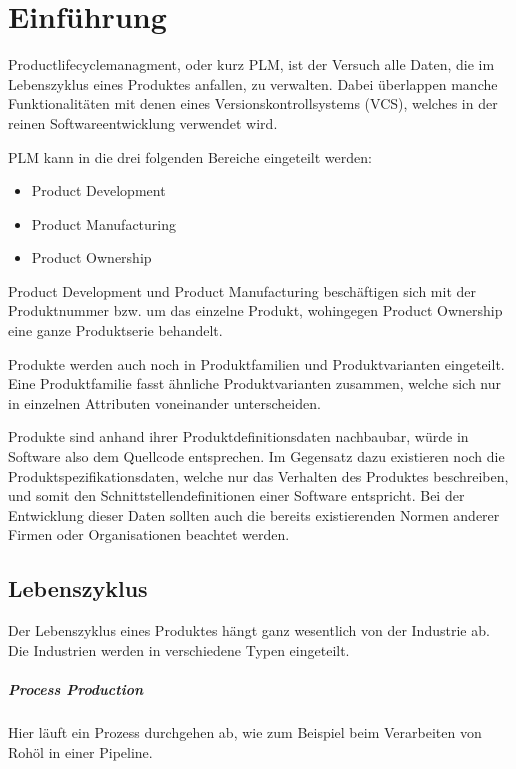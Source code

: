 \chapter{Einführung}

Productlifecyclemanagment, oder kurz PLM, ist der Versuch alle Daten, die im Lebenszyklus eines Produktes anfallen, zu verwalten. Dabei überlappen manche Funktionalitäten mit denen eines Versionskontrollsystems (VCS), welches in der reinen Softwareentwicklung verwendet wird.

PLM kann in die drei folgenden Bereiche eingeteilt werden:

\begin{itemize}
    \item Product Development
    \item Product Manufacturing
    \item Product Ownership
\end{itemize}

Product Development und Product Manufacturing beschäftigen sich mit der Produktnummer bzw. um das einzelne Produkt, wohingegen Product Ownership eine ganze Produktserie behandelt.

Produkte werden auch noch in Produktfamilien und Produktvarianten eingeteilt. Eine Produktfamilie fasst ähnliche Produktvarianten zusammen, welche sich nur in einzelnen Attributen voneinander unterscheiden.

Produkte sind anhand ihrer Produktdefinitionsdaten nachbaubar, würde in Software also dem Quellcode entsprechen. Im Gegensatz dazu existieren noch die Produktspezifikationsdaten, welche nur das Verhalten des Produktes beschreiben, und somit den Schnittstellendefinitionen einer Software entspricht. Bei der Entwicklung dieser Daten sollten auch die bereits existierenden Normen anderer Firmen oder Organisationen beachtet werden.

\section{Lebenszyklus}

Der Lebenszyklus eines Produktes hängt ganz wesentlich von der Industrie ab. Die Industrien werden in verschiedene Typen eingeteilt.

\paragraph{Process Production}
Hier läuft ein Prozess durchgehen ab, wie zum Beispiel beim Verarbeiten von Rohöl in einer Pipeline.

